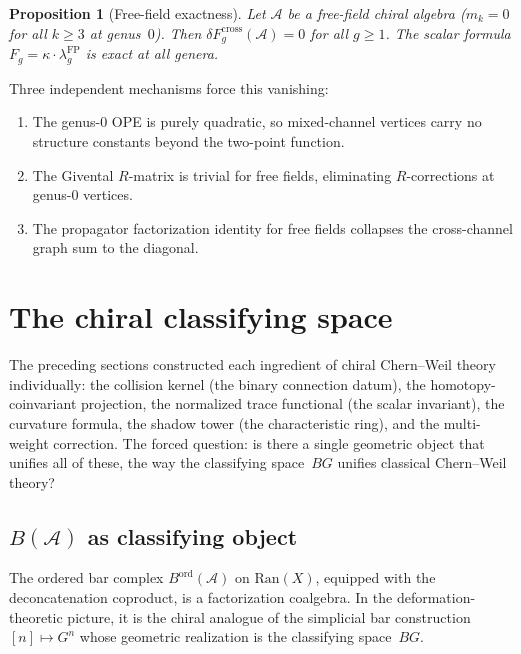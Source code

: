 \documentclass[11pt,reqno]{amsart}
\newtheorem{proposition}[theorem]{Proposition}
\theoremstyle{definition}
\theoremstyle{remark}
\newcommand{\cA}{\mathcal{A}}
\newcommand{\Ran}{\mathrm{Ran}}
\numberwithin{equation}{section}
\begin{document}
\begin{proposition}[Free-field exactness]
\label{prop:free-field-exact}
Let $\cA$ be a free-field chiral algebra
\textup{(}$m_k = 0$ for all $k \ge 3$ at genus~$0$\textup{)}.
Then $\delta F_g^{\mathrm{cross}}(\cA) = 0$ for all
$g \ge 1$. The scalar formula
$F_g = \kappa\cdot\lambda_g^{\mathrm{FP}}$ is exact at all
genera.
\end{proposition}

Three independent mechanisms force this vanishing:
\begin{enumerate}[(1)]
\item The genus-$0$ OPE is purely quadratic, so mixed-channel
 vertices carry no structure constants beyond the two-point
 function.
\item The Givental $R$-matrix is trivial for free fields,
 eliminating $R$-corrections at genus-$0$ vertices.
\item The propagator factorization identity for free fields
 collapses the cross-channel graph sum to the diagonal.
\end{enumerate}


\section{The chiral classifying space}\label{sec:classifying}

The preceding sections constructed each ingredient of chiral
Chern--Weil theory individually: the collision kernel (the binary
connection datum), the homotopy-coinvariant projection, the normalized
trace functional (the scalar invariant), the curvature formula, the shadow tower (the
characteristic ring), and the multi-weight correction.
The forced question: is there a single geometric object that
unifies all of these, the way the classifying space~$BG$
unifies classical Chern--Weil theory?

\subsection{$B(\cA)$ as classifying object}

The ordered bar complex $B^{\mathrm{ord}}(\cA)$ on $\Ran(X)$,
equipped with the deconcatenation coproduct, is a factorization
coalgebra. In the deformation-theoretic picture, it is the
chiral analogue of the simplicial bar construction
$[n] \mapsto G^n$ whose geometric realization is the classifying
space~$BG$.
\end{document}
